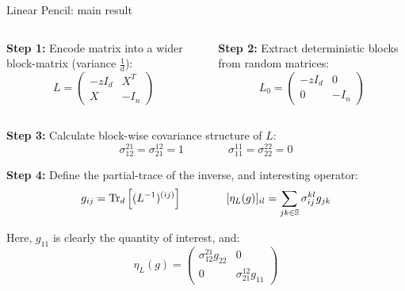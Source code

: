 \documentclass[10pt]{beamer}
\begin{document}
\begin{frame}{Linear Pencil: main result}
  \begin{columns}[T]
    \begin{column}{0.45\textwidth}
  \textbf{Step 1:} Encode matrix into a wider block-matrix (variance $\frac{1}{d}$):
  \begin{equation*}
    L = \begin{pmatrix}
      -z I_d & X^T\\
      X & - I_n
    \end{pmatrix}
  \end{equation*}
\end{column}
\begin{column}{0.45\textwidth}

  \textbf{Step 2:} Extract deterministic blocks from random matrices:
  \begin{equation*}
    L_0 = \begin{pmatrix}
      -z I_d& 0\\
      0 & -I_n
    \end{pmatrix}
  \end{equation*}
  \end{column}
  \end{columns}
    
  \textbf{Step 3:} Calculate block-wise covariance structure of $L$:
  $$
  \sigma_{12}^{21} = \sigma_{21}^{12} = 1 
  \qquad
  \qquad
  \sigma_{11}^{11} = \sigma_{22}^{22} = 0
  $$


  \textbf{Step 4:} Define the partial-trace of the inverse, and interesting operator:
  \begin{equation*}
    g_{ij} = \traceLim[d]{
      (L^{-1})^{(ij)}
    }
    \qquad \qquad
    [\eta_L(g)]_{il} = \sum_{jk \in \mathbb S} \sigma_{ij}^{kl} g_{jk}
  \end{equation*}

  Here, $g_{11}$ is clearly the quantity of interest, and:
  \begin{equation*}
    \eta_L(g) = \begin{pmatrix}
      \sigma_{12}^{21} g_{22} & 0\\
      0 & \sigma_{21}^{12} g_{11}
    \end{pmatrix}
  \end{equation*}
\end{frame}
\end{document}
